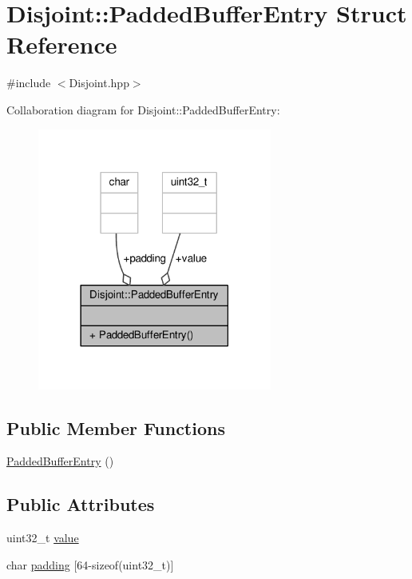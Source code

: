 \hypertarget{structDisjoint_1_1PaddedBufferEntry}{\section{Disjoint\-:\-:Padded\-Buffer\-Entry Struct Reference}
\label{structDisjoint_1_1PaddedBufferEntry}
}


{\ttfamily \#include $<$Disjoint.\-hpp$>$}



Collaboration diagram for Disjoint\-:\-:Padded\-Buffer\-Entry\-:
\nopagebreak
\begin{figure}[H]
\begin{center}
\leavevmode
\includegraphics[width=218pt]{structDisjoint_1_1PaddedBufferEntry__coll__graph}
\end{center}
\end{figure}
\subsection*{Public Member Functions}
\begin{DoxyCompactItemize}
\item 
\hyperlink{structDisjoint_1_1PaddedBufferEntry_a21e73f731ce481688134daf89cd306df}{Padded\-Buffer\-Entry} ()
\end{DoxyCompactItemize}
\subsection*{Public Attributes}
\begin{DoxyCompactItemize}
\item 
uint32\-\_\-t \hyperlink{structDisjoint_1_1PaddedBufferEntry_a3596c7b391c7d83873d17f1ed05cbcf8}{value}
\item 
char \hyperlink{structDisjoint_1_1PaddedBufferEntry_a26d8140a20b0b49ae1f6d990a26b58b2}{padding} \mbox{[}64-\/sizeof(uint32\-\_\-t)\mbox{]}
\end{DoxyCompactItemize}


